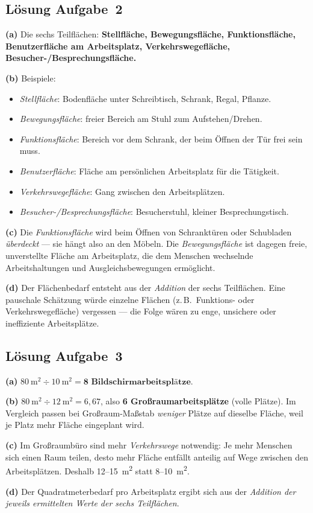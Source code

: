 \documentclass[11pt, a4paper]{article}
\begin{document}
\subsection*{Lösung Aufgabe~2}
\begin{loesung}
\textbf{(a)} Die sechs Teilflächen: \textbf{Stellfläche, Bewegungsfläche, Funktionsfläche,
Benutzerfläche am Arbeitsplatz, Verkehrswegefläche, Besucher-/Besprechungsfläche.}

\textbf{(b)} Beispiele:
\begin{itemize}[itemsep=0pt]
  \item \emph{Stellfläche}: Bodenfläche unter Schreibtisch, Schrank, Regal, Pflanze.
  \item \emph{Bewegungsfläche}: freier Bereich am Stuhl zum Aufstehen/Drehen.
  \item \emph{Funktionsfläche}: Bereich vor dem Schrank, der beim Öffnen der Tür frei sein muss.
  \item \emph{Benutzerfläche}: Fläche am persönlichen Arbeitsplatz für die Tätigkeit.
  \item \emph{Verkehrswegefläche}: Gang zwischen den Arbeitsplätzen.
  \item \emph{Besucher-/Besprechungsfläche}: Besucherstuhl, kleiner Besprechungstisch.
\end{itemize}

\textbf{(c)} Die \emph{Funktionsfläche} wird beim Öffnen von Schranktüren oder Schubladen
\emph{überdeckt} --- sie hängt also an den Möbeln. Die \emph{Bewegungsfläche} ist
dagegen freie, unverstellte Fläche am Arbeitsplatz, die dem Menschen wechselnde
Arbeitshaltungen und Ausgleichs\-bewegungen ermöglicht.

\textbf{(d)} Der Flächenbedarf entsteht aus der \emph{Addition} der sechs Teilflächen.
Eine pauschale Schätzung würde einzelne Flächen (z.\,B.\ Funktions- oder Verkehrswege\-fläche)
vergessen --- die Folge wären zu enge, unsichere oder ineffiziente Arbeitsplätze.
\end{loesung}

\subsection*{Lösung Aufgabe~3}
\begin{loesung}
\textbf{(a)} $80~\text{m}^2 \div 10~\text{m}^2 = \textbf{8 Bildschirmarbeitsplätze}$.

\textbf{(b)} $80~\text{m}^2 \div 12~\text{m}^2 = 6{,}67$, also \textbf{6 Großraum\-arbeitsplätze}
(volle Plätze). Im Vergleich passen bei Großraum-Maßstab \emph{weniger} Plätze auf
dieselbe Fläche, weil je Platz mehr Fläche eingeplant wird.

\textbf{(c)} Im Großraumbüro sind mehr \emph{Verkehrswege} notwendig: Je mehr Menschen
sich einen Raum teilen, desto mehr Fläche entfällt anteilig auf Wege zwischen den
Arbeitsplätzen. Deshalb 12--15~m\textsuperscript{2} statt 8--10~m\textsuperscript{2}.

\textbf{(d)} Der Quadratmeter\-bedarf pro Arbeitsplatz ergibt sich aus der \emph{Addition
der jeweils ermittelten Werte der sechs Teilflächen}.
\end{loesung}
\end{document}
